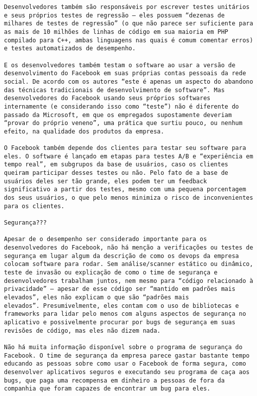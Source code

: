 \begin{verbatim}
Desenvolvedores também são responsáveis por escrever testes unitários
e seus próprios testes de regressão – eles possuem “dezenas de
milhares de testes de regressão” (o que não parece ser suficiente para
as mais de 10 milhões de linhas de código em sua maioria em PHP
compilado para C++, ambas linguagens nas quais é comum comentar erros)
e testes automatizados de desempenho.

E os desenvolvedores também testam o software ao usar a versão de
desenvolvimento do Facebook em suas próprias contas pessoais da rede
social. De acordo com os autores “este é apenas um aspecto do abandono
das técnicas tradicionais de desenvolvimento de software”. Mas
desenvolvedores do Facebook usando seus próprios softwares
internamente (e considerando isso como “teste”) não é diferente do
passado da Microsoft, em que os empregados supostamente deveriam
“provar do próprio veneno”, uma prática que surtiu pouco, ou nenhum
efeito, na qualidade dos produtos da empresa.

O Facebook também depende dos clientes para testar seu software para
eles. O software é lançado em etapas para testes A/B e “experiência em
tempo real”, em subgrupos da base de usuários, caso os clientes
queiram participar desses testes ou não. Pelo fato de a base de
usuários deles ser tão grande, eles podem ter um feedback
significativo a partir dos testes, mesmo com uma pequena porcentagem
dos seus usuários, o que pelo menos minimiza o risco de inconvenientes
para os clientes.

Segurança???

Apesar de o desempenho ser considerado importante para os
desenvolvedores do Facebook, não há menção a verificações ou testes de
segurança em lugar algum da descrição de como os devops da empresa
colocam software para rodar. Sem análise/scanner estático ou dinâmico,
teste de invasão ou explicação de como o time de segurança e
desenvolvedores trabalham juntos, nem mesmo para “código relacionado à
privacidade” – apesar de esse código ser “mantido em padrões mais
elevados”, eles não explicam o que são “padrões mais
elevados”. Presumivelmente, eles contam com o uso de bibliotecas e
frameworks para lidar pelo menos com alguns aspectos de segurança no
aplicativo e possivelmente procurar por bugs de segurança em suas
revisões de código, mas eles não dizem nada.

Não há muita informação disponível sobre o programa de segurança do
Facebook. O time de segurança da empresa parece gastar bastante tempo
educando as pessoas sobre como usar o Facebook de forma segura, como
desenvolver aplicativos seguros e executando seu programa de caça aos
bugs, que paga uma recompensa em dinheiro a pessoas de fora da
companhia que foram capazes de encontrar um bug para eles.


\end{verbatim}
